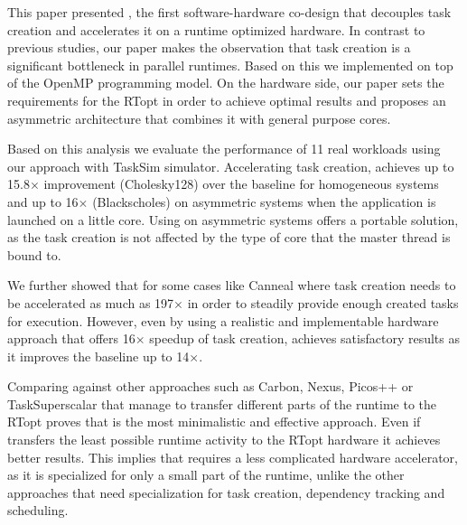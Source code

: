 This paper presented {\proposal}, the first software-hardware co-design that decouples task creation and accelerates it on a runtime optimized hardware.
In contrast to previous studies, our paper makes the observation that task creation is a significant bottleneck in parallel runtimes.
Based on this we implemented {\proposal} on top of the OpenMP programming model.
On the hardware side, our paper sets the requirements for the RTopt in order to achieve optimal results and proposes an asymmetric architecture that combines it with general purpose cores.

Based on this analysis we evaluate the performance of 11 real workloads using our approach with TaskSim simulator.
Accelerating task creation, {\proposal} achieves up to 15.8$\times$ improvement (Cholesky128) over the baseline for homogeneous systems and up to 16$\times$ (Blackscholes) on asymmetric systems when the application is launched on a little core.
Using {\proposal} on asymmetric systems offers a portable solution, as the task creation is not affected by the type of core that the master thread is bound to. 


We further showed that for some cases like Canneal where task creation needs to be accelerated as much as 197$\times$ in order to steadily provide enough created tasks for execution.
However, even by using a realistic and implementable hardware approach that offers 16$\times$ speedup of task creation, achieves satisfactory results as it improves the baseline up to 14$\times$.

Comparing {\proposal} against other approaches such as Carbon, Nexus, Picos++ or TaskSuperscalar that manage to transfer different parts of the runtime to the RTopt proves that {\proposal} is the most minimalistic and effective approach.
Even if {\proposal} transfers the least possible runtime activity to the RTopt hardware it achieves better results.
This implies that {\proposal} requires a less complicated hardware accelerator, as it is specialized for only a small part of the runtime, unlike the other approaches that need specialization for task creation, dependency tracking and scheduling.




